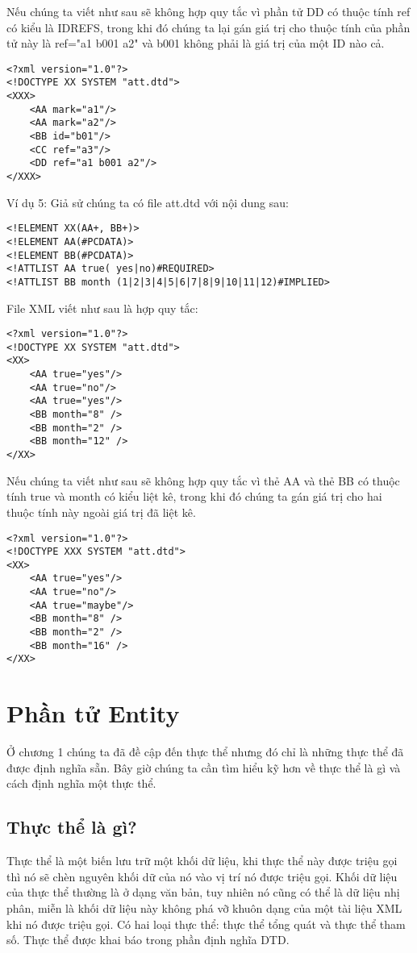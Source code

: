 Nếu chúng ta viết như sau sẽ không hợp quy tắc vì phần tử {\ttfamily  DD} có thuộc tính {\ttfamily  ref} có kiểu là {\ttfamily IDREFS}, trong khi đó chúng ta lại gán giá trị cho thuộc tính của phần tử này là {\ttfamily  ref="a1 b001 a2"} và {\ttfamily b001} không phải là giá trị của một {\ttfamily ID} nào cả.
\begin{lstlisting}
<?xml version="1.0"?>
<!DOCTYPE XX SYSTEM "att.dtd">
<XXX>
	<AA mark="a1"/>
	<AA mark="a2"/>   
	<BB id="b01"/>
	<CC ref="a3"/>
	<DD ref="a1 b001 a2"/>
</XXX>
\end{lstlisting}

Ví dụ 5: Giả sử chúng ta có file att.dtd với nội dung sau:
\begin{lstlisting}
<!ELEMENT XX(AA+, BB+)>
<!ELEMENT AA(#PCDATA)>
<!ELEMENT BB(#PCDATA)>
<!ATTLIST AA true( yes|no)#REQUIRED>
<!ATTLIST BB month (1|2|3|4|5|6|7|8|9|10|11|12)#IMPLIED>
\end{lstlisting}

File XML viết như sau là hợp quy tắc:
\begin{lstlisting}
<?xml version="1.0"?>
<!DOCTYPE XX SYSTEM "att.dtd">
<XX>
	<AA true="yes"/>
	<AA true="no"/>
	<AA true="yes"/>
	<BB month="8" />
	<BB month="2" />
	<BB month="12" />
</XX>
\end{lstlisting}

Nếu chúng ta viết như sau sẽ không hợp quy tắc vì thẻ {\ttfamily AA} và thẻ {\ttfamily BB} có thuộc tính {\ttfamily true} và {\ttfamily month} có kiểu liệt kê, trong khi đó chúng ta gán giá trị cho hai thuộc tính này ngoài giá trị đã liệt kê.
\begin{lstlisting}
<?xml version="1.0"?>
<!DOCTYPE XXX SYSTEM "att.dtd">
<XX>
	<AA true="yes"/>
	<AA true="no"/>
	<AA true="maybe"/>
	<BB month="8" />
	<BB month="2" />
	<BB month="16" />
</XX>
\end{lstlisting}
\section {Phần tử Entity}
\label{muc2.5}
Ở chương 1 chúng ta đã đề cập đến thực thể nhưng đó chỉ là những thực thể đã được định nghĩa sẵn. Bây giờ chúng ta cần tìm hiểu kỹ hơn về thực thể là gì và cách định nghĩa một thực thể.
\subsection{Thực thể là gì?}
Thực thể là một biến lưu trữ một khối dữ liệu, khi thực thể này được triệu gọi thì nó sẽ chèn nguyên khối dữ của nó vào vị trí nó được triệu gọi. Khối dữ liệu của thực thể thường là ở dạng văn bản, tuy nhiên nó cũng có thể là dữ liệu nhị phân, miễn là khối dữ liệu này không phá vỡ khuôn dạng của một tài liệu XML khi nó được triệu gọi. Có hai loại thực thể: thực thể tổng quát và thực thể tham số. Thực thể được khai báo trong phần định nghĩa DTD.
   
